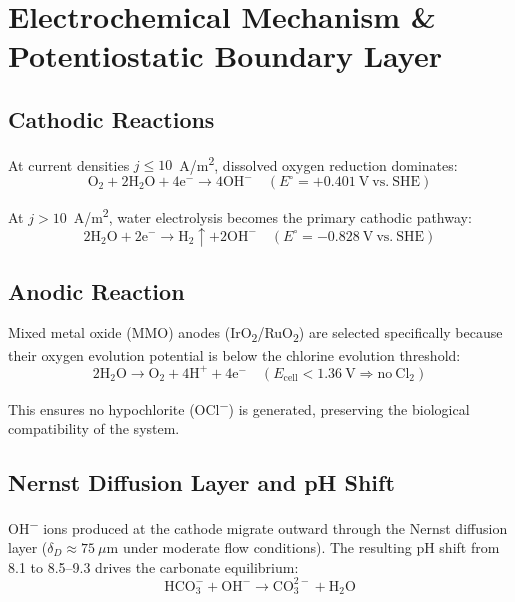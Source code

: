 \documentclass[journal,twocolumn]{IEEEtran}
\begin{document}
\section{Electrochemical Mechanism \& Potentiostatic Boundary Layer}

\subsection{Cathodic Reactions}

At current densities $j \leq 10$~A/m\textsuperscript{2}, dissolved oxygen reduction dominates:
\begin{equation}
  \mathrm{O_2 + 2H_2O + 4e^- \rightarrow 4OH^-} \quad (E^\circ = +0.401~\mathrm{V~vs.~SHE})
  \label{eq:o2red}
\end{equation}

At $j > 10$~A/m\textsuperscript{2}, water electrolysis becomes the primary cathodic pathway:
\begin{equation}
  \mathrm{2H_2O + 2e^- \rightarrow H_2{\uparrow} + 2OH^-} \quad (E^\circ = -0.828~\mathrm{V~vs.~SHE})
  \label{eq:water}
\end{equation}

\subsection{Anodic Reaction}

Mixed metal oxide (MMO) anodes (IrO\textsubscript{2}/RuO\textsubscript{2}) are selected specifically because their oxygen evolution potential is below the chlorine evolution threshold:
\begin{equation}
  \mathrm{2H_2O \rightarrow O_2 + 4H^+ + 4e^-} \quad (E_{\mathrm{cell}} < 1.36~\mathrm{V \Rightarrow no~Cl_2})
  \label{eq:anode}
\end{equation}

This ensures no hypochlorite (OCl\textsuperscript{$-$}) is generated, preserving the biological compatibility of the system.

\subsection{Nernst Diffusion Layer and pH Shift}

OH\textsuperscript{$-$} ions produced at the cathode migrate outward through the Nernst diffusion layer ($\delta_D \approx 75~\mu\mathrm{m}$ under moderate flow conditions). The resulting pH shift from 8.1 to 8.5--9.3 drives the carbonate equilibrium:
\begin{equation}
  \mathrm{HCO_3^- + OH^- \rightarrow CO_3^{2-} + H_2O}
  \label{eq:carb}
\end{equation}
\end{document}
